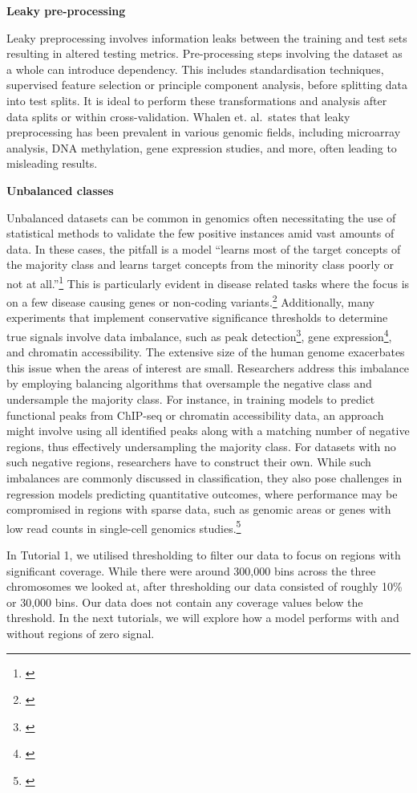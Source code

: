 \documentclass[
]{book}
\begin{document}
\textbf{Leaky pre-processing}

Leaky preprocessing involves information leaks between the training and test sets resulting in altered testing metrics. Pre-processing steps involving the dataset as a whole can introduce dependency. This includes standardisation techniques, supervised feature selection or principle component analysis, before splitting data into test splits. It is ideal to perform these transformations and analysis after data splits or within cross-validation. Whalen et. al.~states that leaky preprocessing has been prevalent in various genomic fields, including microarray analysis, DNA methylation, gene expression studies, and more, often leading to misleading results.

\textbf{Unbalanced classes}

Unbalanced datasets can be common in genomics often necessitating the use of statistical methods to validate the few positive instances amid vast amounts of data. In these cases, the pitfall is a model ``learns most of the target concepts of the majority class and learns target concepts from the minority class poorly or not at all.''\footnote{\citet{muk2014}} This is particularly evident in disease related tasks where the focus is on a few disease causing genes or non-coding variants.\footnote{\citet{muk2014}} Additionally, many experiments that implement conservative significance thresholds to determine true signals involve data imbalance, such as peak detection\footnote{\citet{oh2020}}, gene expression\footnote{\citet{avsec2021}}, and chromatin accessibility. The extensive size of the human genome exacerbates this issue when the areas of interest are small. Researchers address this imbalance by employing balancing algorithms that oversample the negative class and undersample the majority class. For instance, in training models to predict functional peaks from ChIP-seq or chromatin accessibility data, an approach might involve using all identified peaks along with a matching number of negative regions, thus effectively undersampling the majority class. For datasets with no such negative regions, researchers have to construct their own. While such imbalances are commonly discussed in classification, they also pose challenges in regression models predicting quantitative outcomes, where performance may be compromised in regions with sparse data, such as genomic areas or genes with low read counts in single-cell genomics studies.\footnote{\citet{whalen2022}}

In Tutorial 1, we utilised thresholding to filter our data to focus on regions with significant coverage. While there were around 300,000 bins across the three chromosomes we looked at, after thresholding our data consisted of roughly 10\% or 30,000 bins. Our data does not contain any coverage values below the threshold. In the next tutorials, we will explore how a model performs with and without regions of zero signal.
\end{document}

